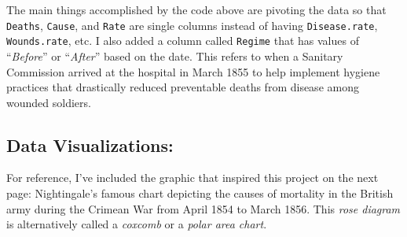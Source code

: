 \documentclass[
  dvipsnames]{article}
\newenvironment{Shaded}{\begin{snugshade}}{\end{snugshade}}
\newcommand{\AttributeTok}[1]{\textcolor[rgb]{0.77,0.63,0.00}{#1}}
\newcommand{\ConstantTok}[1]{\textcolor[rgb]{0.00,0.00,0.00}{#1}}
\newcommand{\FunctionTok}[1]{\textcolor[rgb]{0.00,0.00,0.00}{#1}}
\newcommand{\NormalTok}[1]{#1}
\newcommand{\OtherTok}[1]{\textcolor[rgb]{0.56,0.35,0.01}{#1}}
\newcommand{\SpecialCharTok}[1]{\textcolor[rgb]{0.00,0.00,0.00}{#1}}
\newcommand{\StringTok}[1]{\textcolor[rgb]{0.31,0.60,0.02}{#1}}
\begin{document}
\begin{Shaded}
\end{Shaded}

The main things accomplished by the code above are pivoting the data so
that \texttt{Deaths}, \texttt{Cause}, and \texttt{Rate} are single
columns instead of having \texttt{Disease.rate}, \texttt{Wounds.rate},
etc. I also added a column called \texttt{Regime} that has values of
``\emph{Before}'' or ``\emph{After}'' based on the date. This refers to
when a Sanitary Commission arrived at the hospital in March 1855 to help
implement hygiene practices that drastically reduced preventable deaths
from disease among wounded soldiers.

\hypertarget{section-7}{%
\subsection{\texorpdfstring{\textcolor{TealBlue}{Data Visualizations:}}{}}\label{section-7}}

For reference, I've included the graphic that inspired this project on
the next page: Nightingale's famous chart depicting the causes of
mortality in the British army during the Crimean War from April 1854 to
March 1856. This \emph{rose diagram} is alternatively called a
\emph{coxcomb} or a \emph{polar area chart}.

\newpage
\end{document}
